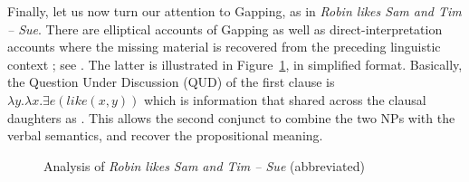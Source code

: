 \documentclass[output=paper
                ,modfonts
                ,nonflat
	        ,collection
	        ,collectionchapter
	        ,collectiontoclongg
 	        ,biblatex
                ,babelshorthands
                ,newtxmath
                ,draftmode
                ,colorlinks, citecolor=brown
]{./langsci/langscibook}
\begin{document}
Finally, let us now turn our attention to Gapping, as in 
\emph{Robin likes Sam and Tim -- Sue}.
There are elliptical accounts of Gapping  \citep{chaves06} as well as direct-interpretation accounts where the missing material is recovered from the preceding linguistic context  \citep{mouret, Mouret:06,Abeille:Blbie:Mouret:14,sangheepark}; see . The latter is illustrated in Figure~\ref{gfig}, in simplified format. Basically, the Question Under Discussion (QUD) \citep{roberts96} of the first clause is $\lambda y.\lambda x. \exists e(like(x,y))$ which is information that shared across the clausal daughters as .
This allows the second conjunct to combine the two NPs with the verbal semantics, and recover the propositional meaning.


\begin{figure}
\oneline{%
\begin{forest}
[S\ms{
      qud     & \ibox{1}\\
      content & \menge{ $\exists e'(like(robin,sam)) \wedge \exists e(like(tim,sue))$ }\\
     } 
 [S\ms{  qud & \ibox{1}\\
         content & \menge{ \ibox{0} $\exists e'(like(robin,sam))$ } %
      } ]
 [S\ms{ qud & \ibox{1}\\
          content & \menge{ \ibox{0} $\wedge \exists e(like(tim,sue))$ }
        }
 [Conj [and]]
 [S\ms{ qud & \ibox{1} \menge{ $\lambda y. \lambda x. \exists e(like(x,y))$ }\\
        content & \menge{ $\exists e(like(t,s))$ } } 
   [NP\ms{ content & \menge{ $tim$ }}]
   [NP\ms{ content & \menge{ $sue$ }}] ]
]]
\end{forest}
}
\caption{Analysis of \emph{Robin likes Sam and Tim -- Sue} (abbreviated)}\label{gfig}
\end{figure}
\end{document}
